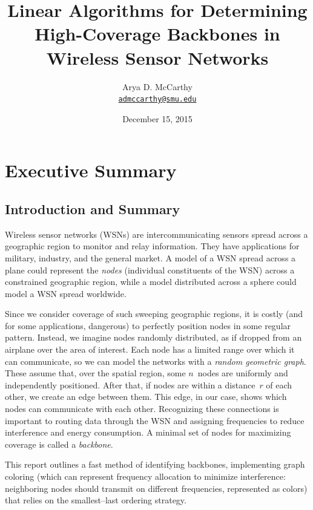 \documentclass[oneside, titlepage]{scrartcl}
\title{Linear Algorithms for Determining High-Coverage Backbones in Wireless Sensor Networks}
\author{Arya D. McCarthy\\\texttt{\href{mailto:admccarthy@smu.edu}{admccarthy@smu.edu}}}
\affil{Southern Methodist University}
\date{December 15, 2015}							%
\begin{document}
\maketitle

\tableofcontents
\newpage

\section{Executive Summary}
\subsection{Introduction and Summary}
Wireless sensor networks (WSNs) are intercommunicating sensors spread across a geographic region to monitor and relay information. They have applications for  military, industry, and the general market. A model of a WSN spread across a plane could represent the \emph{nodes} (individual constituents of the WSN) across a constrained geographic region, while a model distributed across a sphere could model a WSN spread worldwide. 

Since we consider coverage of such sweeping geographic regions, it is costly (and for some applications, dangerous) to perfectly position nodes in some regular pattern. Instead, we imagine nodes randomly distributed, as if dropped from an airplane over the area of interest. Each node has a limited range over which it can communicate, so we can model the networks with a \emph{random geometric graph}. These assume that, over the spatial region, some $n$~nodes are uniformly and independently positioned. After that, if nodes are within a distance~$r$ of each other, we create an edge between them. This edge, in our case, shows which nodes can communicate with each other. Recognizing these connections is important to routing data through the WSN and assigning frequencies to reduce interference and energy consumption. A minimal set of nodes for maximizing coverage is called a \emph{backbone}.

This report outlines a fast method of identifying backbones, implementing graph coloring (which can represent frequency allocation to minimize interference: neighboring nodes should transmit on different frequencies, represented as colors) that relies on the smallest--last ordering strategy.
\end{document}
